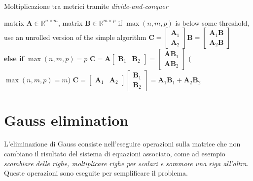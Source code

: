 \documentclass[10pt]{article}
\begin{document}
\begin{algorithm}
\caption{Moltiplicazione tra metrici tramite \textit{divide-and-conquer}}\label{alg:mul_div_conq}
\begin{algorithmic}[1]
\Require matrix $\mathbf{A} \in \mathbb{R}^{n\times m}$, matrix $\mathbf{B} \in \mathbb{R}^{m\times p}$
\State if $\max(n,m,p)$ is below some threshold, use an unrolled version of the simple algorithm
	\State $\mathbf{C} = \begin{bmatrix} \mathbf{A}_1 \\ \mathbf{A}_2 \end{bmatrix}\mathbf{B} = \begin{bmatrix} \mathbf{A}_1 \mathbf{B} \\ \mathbf{A}_2 \mathbf{B} \end{bmatrix}$ 
\\\textbf{else if} $\max(n,m,p) = p$
	\State $\mathbf{C} = \mathbf{A}\begin{bmatrix} \mathbf{B}_1 & \mathbf{B}_2 \end{bmatrix} = \begin{bmatrix} \mathbf{A} \mathbf{B}_1 \\ \mathbf{A} \mathbf{B}_2 \end{bmatrix}$ 
\Else \Comment($\max(n,m,p) = m$)
	\State $\mathbf{C} = \begin{bmatrix} \mathbf{A}_1 & \mathbf{A}_2 \end{bmatrix}\begin{bmatrix} \mathbf{B}_1 \\ \mathbf{B}_2 \end{bmatrix} = \mathbf{A}_1 \mathbf{B}_1 + \mathbf{A}_2 \mathbf{B}_2$ 
\EndIf
\end{algorithmic}
\end{algorithm}






\section{Gauss elimination}

L'eliminazione di Gauss consiste nell'eseguire operazioni sulla matrice che non cambiano il risultato del sistema di equazioni associato, come ad esempio \textit{scambiare delle righe, moltiplicare righe per scalari e sommare una riga all'altra}. Queste operazioni sono eseguite per semplificare il problema.
\end{document}
